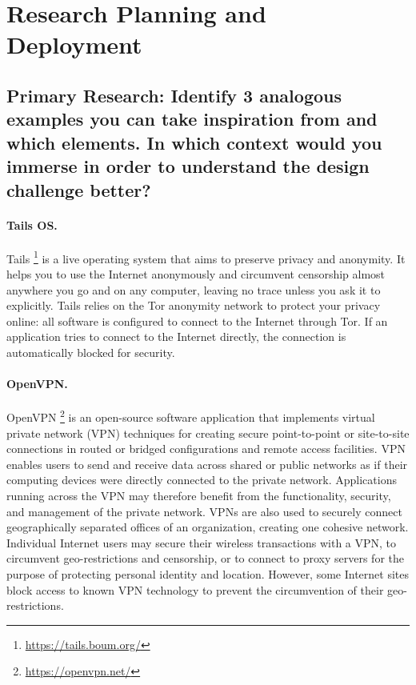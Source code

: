 \vspace{1cm}
\section{Research Planning and Deployment}
\label{sec_b}

\vspace{1cm}
\subsection{Primary Research: Identify 3 analogous examples you can take 
inspiration from and which elements. In which context would you immerse in order 
to understand the design challenge better?}
\vspace{0.7cm}

\paragraph{Tails OS.\\}

Tails \footnote{\url{https://tails.boum.org/}} is a live  operating system that 
aims to preserve privacy and anonymity. 
It helps you to use the Internet anonymously and circumvent censorship almost 
anywhere you go and on any computer, leaving no trace unless you ask it to 
explicitly. Tails relies on the Tor anonymity network to protect your privacy 
online: all software is configured to connect to the Internet through Tor.
If an application tries to connect to the Internet directly, the connection is 
automatically blocked for security.

\paragraph{OpenVPN.\\}

OpenVPN \footnote{\url{https://openvpn.net/}} is an open-source software 
application that implements virtual private 
network (VPN) techniques for creating secure point-to-point or site-to-site 
connections in routed or bridged configurations and remote access facilities.
VPN enables users to send and receive data across shared or public networks as 
if their computing devices were directly connected to the private network. 
Applications running across the VPN may therefore benefit from the functionality, 
security, and management of the private network.
VPNs are  also used to securely connect geographically separated offices of an 
organization, creating one cohesive network. Individual Internet users may 
secure their  wireless transactions with a VPN, to circumvent geo-restrictions 
and censorship, or to connect to proxy servers for the purpose of protecting 
personal identity and location. However, some Internet sites block access to 
known VPN technology to prevent the circumvention of their geo-restrictions.

